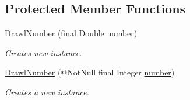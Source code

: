 \subsection*{Protected Member Functions}
\begin{DoxyCompactItemize}
\item 
\hyperlink{classcom_1_1aarrelaakso_1_1drawl_1_1_drawl_number_af2ce0c92fbf306acb37f8781a6d0cf86}{Drawl\+Number} (final Double \hyperlink{classcom_1_1aarrelaakso_1_1drawl_1_1_drawl_number_a9fe9f40163a4f5581b35d61ecf63f278}{number})
\begin{DoxyCompactList}\small\item\em Creates new instance. \end{DoxyCompactList}\item 
\hyperlink{classcom_1_1aarrelaakso_1_1drawl_1_1_drawl_number_ab5d94122fd2eb5e421e4c2ada5271f38}{Drawl\+Number} (@Not\+Null final Integer \hyperlink{classcom_1_1aarrelaakso_1_1drawl_1_1_drawl_number_a9fe9f40163a4f5581b35d61ecf63f278}{number})
\begin{DoxyCompactList}\small\item\em Creates a new instance. \end{DoxyCompactList}\end{DoxyCompactItemize}
